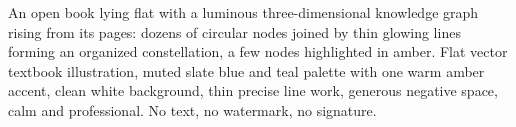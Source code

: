 An open book lying flat with a luminous three-dimensional knowledge graph rising from its pages: dozens of circular nodes joined by thin glowing lines forming an organized constellation, a few nodes highlighted in amber. Flat vector textbook illustration, muted slate blue and teal palette with one warm amber accent, clean white background, thin precise line work, generous negative space, calm and professional. No text, no watermark, no signature.
